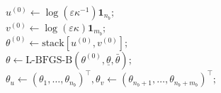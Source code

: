 \begin{algorithm}[htbp]
\nl  $u^{(0)}\gets \log(\varepsilon\kappa^{-1}) \mathbf 1_{n_b} ;$\\
\nl  $v^{(0)} \gets \log(\varepsilon\kappa) \mathbf 1_{m_b} ;$\\
\nl  $\theta^{(0)} \gets \text{stack}[u^{(0)}, v^{(0)}];$\\
\nl   $\theta \gets \text{L-BFGS-B}(\theta^{(0)}, \underline{\theta}, \bar{\theta});$\\
\nl   $\theta_u \gets (\theta_1, \ldots, \theta_{n_b})^\top, \theta_v \gets(\theta_{n_b+1}, \ldots, \theta_{n_b+m_b})^\top;$\\
\\
\\
\nl   {}
\end{algorithm}

